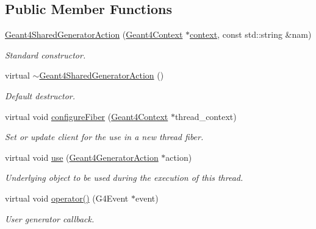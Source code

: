 \subsection*{Public Member Functions}
\begin{DoxyCompactItemize}
\item 
\hyperlink{class_d_d4hep_1_1_simulation_1_1_geant4_shared_generator_action_af6389a70f8ee9868501378ad4a12b3d4}{Geant4\+Shared\+Generator\+Action} (\hyperlink{class_d_d4hep_1_1_simulation_1_1_geant4_context}{Geant4\+Context} $\ast$\hyperlink{class_d_d4hep_1_1_simulation_1_1_geant4_action_aa9d87f0ec2a72b7fc2591b18f98d75cf}{context}, const std\+::string \&nam)
\begin{DoxyCompactList}\small\item\em Standard constructor. \end{DoxyCompactList}\item 
virtual \hyperlink{class_d_d4hep_1_1_simulation_1_1_geant4_shared_generator_action_a56bf96138bef68d15352b9f6e2a5aa00}{$\sim$\+Geant4\+Shared\+Generator\+Action} ()
\begin{DoxyCompactList}\small\item\em Default destructor. \end{DoxyCompactList}\item 
virtual void \hyperlink{class_d_d4hep_1_1_simulation_1_1_geant4_shared_generator_action_a9ca0ac287c96f37ceaa07740c43e7457}{configure\+Fiber} (\hyperlink{class_d_d4hep_1_1_simulation_1_1_geant4_context}{Geant4\+Context} $\ast$thread\+\_\+context)
\begin{DoxyCompactList}\small\item\em Set or update client for the use in a new thread fiber. \end{DoxyCompactList}\item 
virtual void \hyperlink{class_d_d4hep_1_1_simulation_1_1_geant4_shared_generator_action_af092e3cb7a9419081c990106067fb90c}{use} (\hyperlink{class_d_d4hep_1_1_simulation_1_1_geant4_generator_action}{Geant4\+Generator\+Action} $\ast$action)
\begin{DoxyCompactList}\small\item\em Underlying object to be used during the execution of this thread. \end{DoxyCompactList}\item 
virtual void \hyperlink{class_d_d4hep_1_1_simulation_1_1_geant4_shared_generator_action_a21ff9d287af96c7bb0a3cf8975cac070}{operator()} (G4\+Event $\ast$event)
\begin{DoxyCompactList}\small\item\em User generator callback. \end{DoxyCompactList}\end{DoxyCompactItemize}
